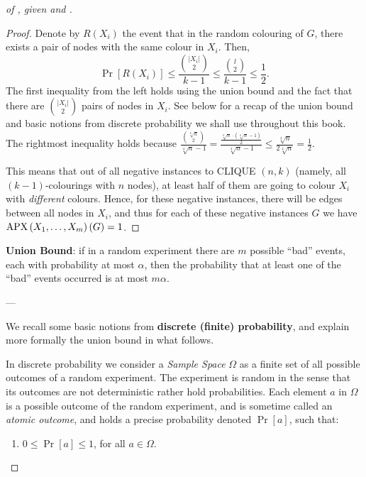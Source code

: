 \begin{proof}[of , given   and ]
\begin{proof}
Denote by $R\left(X_i\right)$ the event that in the random colouring of $G$, there exists a pair of nodes with the same colour in $X_i$.
Then, 
$$
\operatorname{Pr}\left[R\left(X_i\right)\right] \leq \frac{\binom{|X_i |}{2}}{k-1} \leq \frac{\binom{l}{2}}{k-1} \leq \frac{1}{2}.
$$
The first inequality from the left holds using the union bound and the fact that there are $\binom{\mid X_i |}{2}$ pairs
of nodes in $X_i$. See below for a recap of the union bound and basic notions from discrete probability we shall use throughout this book.
The rightmost inequality holds because 
$ \frac{\binom{\sqrt[8]{n}}{2}}{\sqrt[4]{n}-1}
= \frac{\frac{\sqrt[8]{n} \cdot(\sqrt[8]{n}-1)}{2}}{\sqrt[4]{n}-1} \le \frac{\sqrt[4]{n}}{2\sqrt[4]{n}}=\frac{1}{2}.
$



This means that out of all negative instances to CLIQUE $(n, k)$ (namely, all $(k-1)$-colourings with $n$ nodes), at least half of them are going to colour $X_i$ with \emph{different} colours. Hence, for these negative instances, there will be edges between all nodes in $X_i$, and thus for each of these negative instances $G$ we have $\mathrm{APX}\left(X_1, \ldots, X_m\right)(G)=1$.
\end{proof}




\begin{tcolorbox}[colframe=white, colback=green!4, boxrule=0mm, sharp corners]
\textbf{Union Bound}: if in a random experiment
there are $m$ possible ``bad'' events, each with probability at most $\alpha$, then the probability that at least one of the ``bad'' events occurred is at most $m\alpha$.

\small
\medskip 
---

We recall some  basic notions from  \textbf{discrete (finite) probability}, and explain more formally the union bound in what follows.

In discrete probability we consider a \emph{ Sample Space}
$\Omega$ as a finite set of  all possible outcomes of a random experiment. The experiment is random in the sense that its outcomes are not deterministic rather hold  probabilities. 
Each element $a$ in $\Omega$ is a possible outcome of the  random experiment, and is sometime called an \emph{atomic outcome}, and  holds a precise probability denoted $\Pr\left[a \right]$, such that:
\begin{enumerate}
\item $0\le \Pr\left[a\right]\le 1$, for all $a\in\Omega$.


\end{enumerate}
\end{tcolorbox}
\end{proof}
